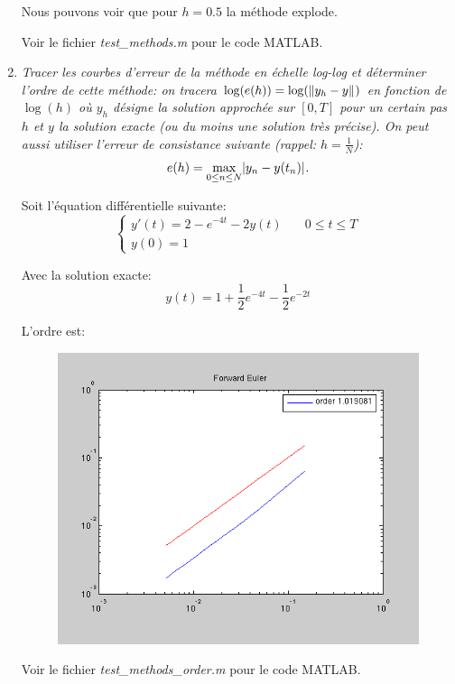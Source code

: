 \documentclass[a4paper,10pt]{article}
\begin{document}
\begin{enumerate}
    Nous pouvons voir que pour $h = 0.5$ la méthode explode.

    Voir le fichier \emph{test\_methods.m} pour le code MATLAB.

    \item \emph{Tracer les courbes d’erreur de la méthode en échelle log-log et
    déterminer l'ordre de cette méthode: on tracera $\log(e(h)) = \log(\lVert y_h -
    y\rVert_{})$ en fonction de $\log(h)$ où $y_h$ désigne la solution approchée sur
    $[0, T]$ pour un certain pas $h$ et $y$ la solution exacte (ou du moins une
    solution très précise). On peut aussi utiliser l'erreur de consistance
    suivante (rappel: $h = \frac{1}{N}$):}
\[
    e(h) = \max_{0 \leq n \leq N} \lvert y_n - y(t_n)\rvert_{}.
\]

    Soit l'équation différentielle suivante:
\begin{equation}\label{eq:eq2}
\left\{
\begin{array}{ll}
    y'(t) = 2 - e^{-4t} - 2y(t) & \quad 0 \leq t \leq T \\
    y(0) = 1
\end{array}
\right.
\end{equation}

    Avec la solution exacte:
\[
    y(t) = 1 + \frac{1}{2} e^{-4t} - \frac{1}{2} e^{-2t}
\]
\clearpage

    L'ordre est:
\begin{figure}[h!]
    \centering
    \includegraphics[scale=0.5]{./img/order-forward-euler.png}
\end{figure}

    Voir le fichier \emph{test\_methods\_order.m} pour le code MATLAB.
\end{enumerate}
\end{document}
